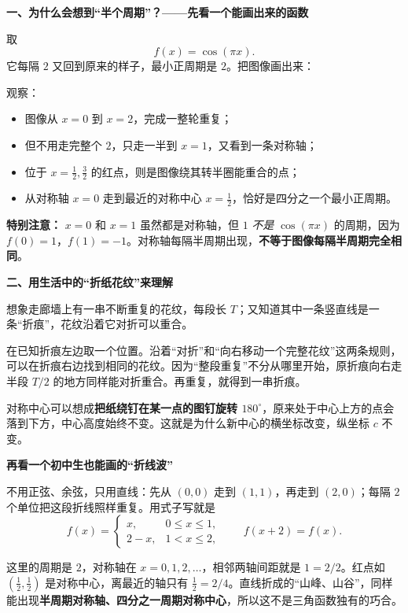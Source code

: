\clearpage
\begin{explanationbox}
\textbf{\textcolor{CExplanation}{一、为什么会想到“半个周期”？——先看一个能画出来的函数}}



取
\[
f(x)=\cos(\pi x).
\]
它每隔 $2$ 又回到原来的样子，最小正周期是 $2$。把图像画出来：



观察：
\begin{itemize}[leftmargin=*,itemsep=0.35em]
\item 图像从 $x=0$ 到 $x=2$，完成一整轮重复；
\item 但不用走完整个 $2$，只走一半到 $x=1$，又看到一条对称轴；
\item 位于 $x=\tfrac12,\tfrac32$ 的红点，则是图像绕其转半圈能重合的点；
\item 从对称轴 $x=0$ 走到最近的对称中心 $x=\tfrac12$，恰好是四分之一个最小正周期。
\end{itemize}

\textbf{特别注意：} $x=0$ 和 $x=1$ 虽然都是对称轴，但 $1$ \emph{不是} $\cos(\pi x)$ 的周期，因为 $f(0)=1$，$f(1)=-1$。对称轴每隔半周期出现，\textbf{不等于图像每隔半周期完全相同}。

\medskip

\end{explanationbox}
\clearpage
\begin{explanationbox}
\textbf{\textcolor{CExplanation}{二、用生活中的“折纸花纹”来理解}}



想象走廊墙上有一串不断重复的花纹，每段长 $T$；又知道其中一条竖直线是一条“折痕”，花纹沿着它对折可以重合。

在已知折痕左边取一个位置。沿着“对折”和“向右移动一个完整花纹”这两条规则，可以在折痕右边找到相同的花纹。因为“整段重复”不分从哪里开始，原折痕向右走半段 $T/2$ 的地方同样能对折重合。再重复，就得到一串折痕。

对称中心可以想成\textbf{把纸绕钉在某一点的图钉旋转 $180^\circ$}，原来处于中心上方的点会落到下方，中心高度始终不变。这就是为什么新中心的横坐标改变，纵坐标 $c$ 不变。

\medskip
\end{explanationbox}\clearpage\begin{explanationbox}\textbf{\textcolor{CExplanation}{再看一个初中生也能画的“折线波”}}



不用正弦、余弦，只用直线：先从 $(0,0)$ 走到 $(1,1)$，再走到 $(2,0)$；每隔 $2$ 个单位把这段折线照样重复。用式子写就是
\[
f(x)=\begin{cases}
x,&0\le x\le1,\\
2-x,&1<x\le2,
\end{cases}\qquad f(x+2)=f(x).
\]



这里的周期是 $2$，对称轴在 $x=0,1,2,\ldots$，相邻两轴间距就是 $1=2/2$。红点如 $(\tfrac12,\tfrac12)$ 是对称中心，离最近的轴只有 $\tfrac12=2/4$。直线折成的“山峰、山谷”，同样能出现\textbf{半周期对称轴、四分之一周期对称中心}，所以这不是三角函数独有的巧合。

\medskip

\end{explanationbox}
